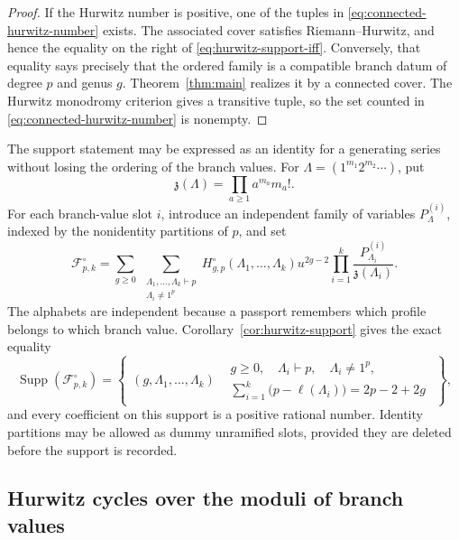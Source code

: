 \documentclass[10pt,a4paper]{amsart}
\numberwithin{equation}{section}
\begin{document}
\begin{proof}
If the Hurwitz number is positive, one of the tuples in
\eqref{eq:connected-hurwitz-number} exists.  The associated cover satisfies
Riemann--Hurwitz, and hence the equality on the right of
\eqref{eq:hurwitz-support-iff}.  Conversely, that equality says precisely
that the ordered family is a compatible branch datum of degree $p$ and
genus $g$.  Theorem~\ref{thm:main} realizes it by a connected cover.  The
Hurwitz monodromy criterion gives a transitive tuple, so the set counted in
\eqref{eq:connected-hurwitz-number} is nonempty.
\end{proof}

The support statement may be expressed as an identity for a generating
series without losing the ordering of the branch values.  For
$\Lambda=(1^{m_1}2^{m_2}\cdots)$, put
\[
 \mathfrak z(\Lambda)=\prod_{a\geq1}a^{m_a}m_a!.
\]
For each branch-value slot $i$, introduce an independent family of
variables $P^{(i)}_\Lambda$, indexed by the nonidentity partitions of $p$,
and set
\begin{equation}\label{eq:prime-hurwitz-potential}
 \mathcal F^\circ_{p,k}
 =\sum_{g\geq0}\ \sum_{\substack{\Lambda_1,\ldots,\Lambda_k\vdash p\\
                                  \Lambda_i\neq1^p}}
 H^\circ_{g,p}(\Lambda_1,\ldots,\Lambda_k)
 u^{2g-2}\prod_{i=1}^k
 \frac{P^{(i)}_{\Lambda_i}}{\mathfrak z(\Lambda_i)}.
\end{equation}
The alphabets are independent because a passport remembers which profile
belongs to which branch value.  Corollary~\ref{cor:hurwitz-support} gives
the exact equality
\begin{equation}\label{eq:potential-support}
 \operatorname{Supp}(\mathcal F^\circ_{p,k})
 =\left\{\begin{array}{c|c}
  (g,\Lambda_1,\ldots,\Lambda_k)&
  \begin{array}{c}
   g\geq0,\quad \Lambda_i\vdash p,\quad \Lambda_i\neq1^p,\\
   \displaystyle\sum_{i=1}^k\bigl(p-\ell(\Lambda_i)\bigr)=2p-2+2g
  \end{array}
 \end{array}\right\},
\end{equation}
and every coefficient on this support is a positive rational number.
Identity partitions may be allowed as dummy unramified slots, provided
they are deleted before the support is recorded.

\subsection{Hurwitz cycles over the moduli of branch values}
\end{document}
